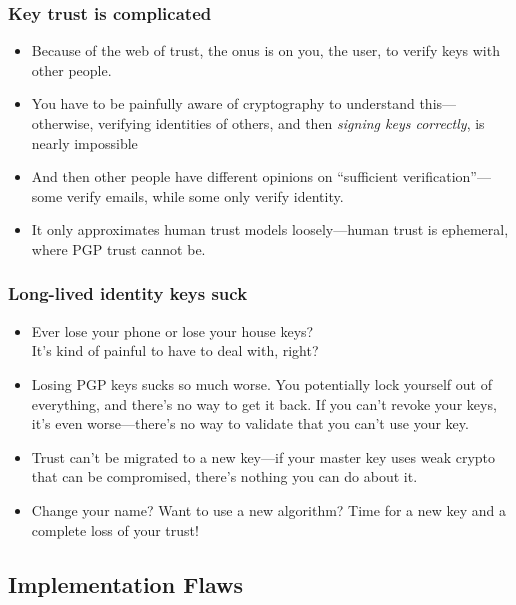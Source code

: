 \documentclass[aspectratio=1610,bigger,utf8]{beamer}
\begin{document}
\begin{frame}
	\frametitle{Key trust is complicated}
	\begin{itemize}
		\item Because of the web of trust, the onus is on you, the
			user, to verify keys with other people.
		\item You have to be \alert{painfully aware of cryptography} to
			understand this---otherwise, verifying identities of
			others, and then \emph{signing keys correctly}, is
			nearly impossible
		\item And then other people have different opinions on
			``sufficient verification''---some verify emails, while
			some only verify identity.
		\item It only approximates human trust models loosely---human
			trust is ephemeral, where PGP trust cannot be.
	\end{itemize}
\end{frame}
\begin{frame}
	\frametitle{Long-lived identity keys suck}
	\begin{itemize}
		\item Ever lose your phone or lose your house keys?\pause\\
			It's kind of \alert{painful} to have to deal with,
			right?\pause
		\item Losing PGP keys sucks so much worse. You potentially
			lock yourself out of everything, and there's no way to
			get it back. If you can't revoke your keys, it's even
			worse---there's no way to validate that you can't use
			your key.\pause
		\item Trust can't be migrated to a new key---if your master key
			uses weak crypto that can be compromised, there's
			nothing you can do about it.
		\item Change your name? Want to use a new algorithm? Time for a
			new key and a complete loss of your trust!
	\end{itemize}
\end{frame}

\subsection{Implementation Flaws}
\end{document}
